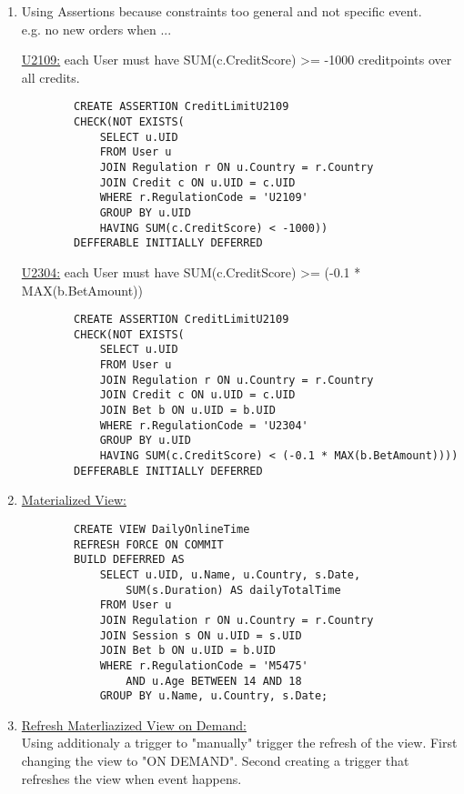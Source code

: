\documentclass{article}
\begin{document}
\begin{enumerate}[label=\alph*)]

    \item Using Assertions because constraints too general and not specific event. \\ e.g. no new orders when ...
        
        \underline{U2109:} each User must have SUM(c.CreditScore) >= -1000 creditpoints over all credits. 


        \begin{verbatim}
        CREATE ASSERTION CreditLimitU2109
        CHECK(NOT EXISTS(
            SELECT u.UID
            FROM User u
            JOIN Regulation r ON u.Country = r.Country
            JOIN Credit c ON u.UID = c.UID
            WHERE r.RegulationCode = 'U2109'
            GROUP BY u.UID
            HAVING SUM(c.CreditScore) < -1000))
        DEFFERABLE INITIALLY DEFERRED
        \end{verbatim}

        \underline{U2304:} each User must have SUM(c.CreditScore) >= (-0.1 * MAX(b.BetAmount))

        \begin{verbatim}
        CREATE ASSERTION CreditLimitU2109
        CHECK(NOT EXISTS(
            SELECT u.UID
            FROM User u
            JOIN Regulation r ON u.Country = r.Country
            JOIN Credit c ON u.UID = c.UID
            JOIN Bet b ON u.UID = b.UID
            WHERE r.RegulationCode = 'U2304'
            GROUP BY u.UID
            HAVING SUM(c.CreditScore) < (-0.1 * MAX(b.BetAmount))))
        DEFFERABLE INITIALLY DEFERRED
        \end{verbatim}

    \item \underline{Materialized View:}
    
    \begin{verbatim}
        CREATE VIEW DailyOnlineTime
        REFRESH FORCE ON COMMIT 
        BUILD DEFERRED AS
            SELECT u.UID, u.Name, u.Country, s.Date, 
                SUM(s.Duration) AS dailyTotalTime
            FROM User u
            JOIN Regulation r ON u.Country = r.Country
            JOIN Session s ON u.UID = s.UID
            JOIN Bet b ON u.UID = b.UID
            WHERE r.RegulationCode = 'M5475' 
                AND u.Age BETWEEN 14 AND 18
            GROUP BY u.Name, u.Country, s.Date;
        \end{verbatim}

    \item \underline{Refresh Materliazized View on Demand:}\\
        Using additionaly a trigger to "manually" trigger the refresh of the view.
        First changing the view to "ON DEMAND".
        Second creating a trigger that refreshes the view when event happens.


\end{enumerate}
\end{document}
